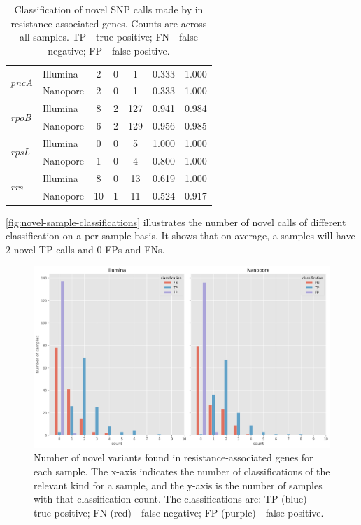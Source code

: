 \begin{table}
\begin{tabular}{|l|l|c|c|c|c|c|}
\multirow{2}{*}{\textit{pncA}}  & Illumina   & 2  & 0  & 1   & 0.333  & 1.000     \\ \cline{2-7} 
                                & Nanopore   & 2  & 0  & 1   & 0.333  & 1.000     \\ \hline
\multirow{2}{*}{\textit{rpoB}}  & Illumina   & 8  & 2  & 127 & 0.941  & 0.984     \\ \cline{2-7} 
                                & Nanopore   & 6  & 2  & 129 & 0.956  & 0.985     \\ \hline
\multirow{2}{*}{\textit{rpsL}}  & Illumina   & 0  & 0  & 5   & 1.000  & 1.000     \\ \cline{2-7} 
                                & Nanopore   & 1  & 0  & 4   & 0.800  & 1.000     \\ \hline
\multirow{2}{*}{\textit{rrs}}   & Illumina   & 8  & 0  & 13  & 0.619  & 1.000     \\ \cline{2-7} 
                                & Nanopore   & 10 & 1  & 11  & 0.524  & 0.917     \\ \hline
\end{tabular}
\caption{Classification of novel SNP calls made by \drprg{} in resistance-associated genes. Counts are across all samples. TP - true positive; FN - false negative; FP - false positive.}
\label{tab:novel-classifications}
\end{table}

\autoref{fig:novel-sample-classifications} illustrates the number of novel calls of different classification on a per-sample basis. It shows that on average, a samples will have 2 novel TP calls and 0 FPs and FNs. 

\begin{figure}
\begin{center}
\includegraphics[width=0.90\columnwidth]{Chapter3/Figs/novel_classifications_per_sample.png}
\caption{{Number of novel variants found in resistance-associated genes for each sample. The x-axis indicates the number of classifications of the relevant kind for a sample, and the y-axis is the number of samples with that classification count. The classifications are: TP (blue) - true positive; FN (red) - false negative; FP (purple) - false positive.
{\label{fig:novel-sample-classifications}}
}}
\end{center}
\end{figure}

